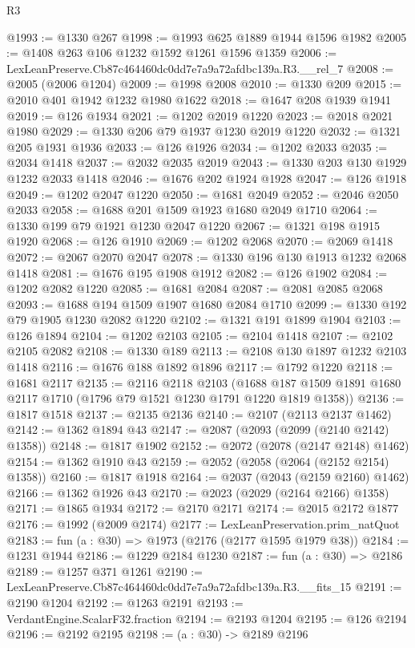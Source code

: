 \begin{lexlean}{R3}
\begin{coremodule}
@1993 := @1330 @267
@1998 := @1993 @625 @1889 @1944 @1596 @1982
@2005 := @1408 @263 @106 @1232 @1592 @1261 @1596 @1359
@2006 := LexLeanPreserve.Cb87c464460dc0dd7e7a9a72afdbc139a.R3.__rel_7
@2008 := @2005 (@2006 @1204)
@2009 := @1998 @2008
@2010 := @1330 @209
@2015 := @2010 @401 @1942 @1232 @1980 @1622
@2018 := @1647 @208 @1939 @1941
@2019 := @126 @1934
@2021 := @1202 @2019 @1220
@2023 := @2018 @2021 @1980
@2029 := @1330 @206 @79 @1937 @1230 @2019 @1220
@2032 := @1321 @205 @1931 @1936
@2033 := @126 @1926
@2034 := @1202 @2033
@2035 := @2034 @1418
@2037 := @2032 @2035 @2019
@2043 := @1330 @203 @130 @1929 @1232 @2033 @1418
@2046 := @1676 @202 @1924 @1928
@2047 := @126 @1918
@2049 := @1202 @2047 @1220
@2050 := @1681 @2049
@2052 := @2046 @2050 @2033
@2058 := @1688 @201 @1509 @1923 @1680 @2049 @1710
@2064 := @1330 @199 @79 @1921 @1230 @2047 @1220
@2067 := @1321 @198 @1915 @1920
@2068 := @126 @1910
@2069 := @1202 @2068
@2070 := @2069 @1418
@2072 := @2067 @2070 @2047
@2078 := @1330 @196 @130 @1913 @1232 @2068 @1418
@2081 := @1676 @195 @1908 @1912
@2082 := @126 @1902
@2084 := @1202 @2082 @1220
@2085 := @1681 @2084
@2087 := @2081 @2085 @2068
@2093 := @1688 @194 @1509 @1907 @1680 @2084 @1710
@2099 := @1330 @192 @79 @1905 @1230 @2082 @1220
@2102 := @1321 @191 @1899 @1904
@2103 := @126 @1894
@2104 := @1202 @2103
@2105 := @2104 @1418
@2107 := @2102 @2105 @2082
@2108 := @1330 @189
@2113 := @2108 @130 @1897 @1232 @2103 @1418
@2116 := @1676 @188 @1892 @1896
@2117 := @1792 @1220
@2118 := @1681 @2117
@2135 := @2116
    @2118
    @2103
    (@1688 @187 @1509 @1891 @1680 @2117 @1710 (@1796 @79 @1521 @1230 @1791 @1220 @1819 @1358))
@2136 := @1817 @1518
@2137 := @2135 @2136
@2140 := @2107 (@2113 @2137 @1462)
@2142 := @1362 @1894 @43
@2147 := @2087 (@2093 (@2099 (@2140 @2142) @1358))
@2148 := @1817 @1902
@2152 := @2072 (@2078 (@2147 @2148) @1462)
@2154 := @1362 @1910 @43
@2159 := @2052 (@2058 (@2064 (@2152 @2154) @1358))
@2160 := @1817 @1918
@2164 := @2037 (@2043 (@2159 @2160) @1462)
@2166 := @1362 @1926 @43
@2170 := @2023 (@2029 (@2164 @2166) @1358)
@2171 := @1865 @1934
@2172 := @2170 @2171
@2174 := @2015 @2172 @1877
@2176 := @1992 (@2009 @2174)
@2177 := LexLeanPreservation.prim_natQuot
@2183 := fun (a : @30) => @1973 (@2176 (@2177 @1595 @1979 @38))
@2184 := @1231 @1944
@2186 := @1229 @2184 @1230
@2187 := fun (a : @30) => @2186
@2189 := @1257 @371 @1261
@2190 := LexLeanPreserve.Cb87c464460dc0dd7e7a9a72afdbc139a.R3.__fits_15
@2191 := @2190 @1204
@2192 := @1263 @2191
@2193 := VerdantEngine.ScalarF32.fraction
@2194 := @2193 @1204
@2195 := @126 @2194
@2196 := @2192 @2195
@2198 := (a : @30) -> @2189 @2196

\end{coremodule}
\end{lexlean}
